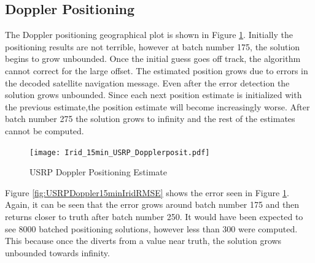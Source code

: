 \documentclass[12pt]{report}
\begin{document}
\subsection{Doppler Positioning}
The Doppler positioning geographical plot is shown in Figure \ref{fig:USRPDoppler15minIridPosit}. Initially the positioning results are not terrible, however at batch number 175, the solution begins to grow unbounded. Once the initial guess goes off track, the algorithm cannot correct for the large offset. The estimated position grows due to errors in the decoded satellite navigation message. Even after the error detection the solution grows unbounded. Since each next position estimate is initialized with the previous estimate,the position estimate will become increasingly worse. After batch number 275 the solution grows to infinity and the rest of the estimates cannot be computed. 

\begin{figure}[h!]
    \centering
    \texttt{[image: Irid\_15min\_USRP\_Dopplerposit.pdf]}
    \caption{USRP Doppler Positioning Estimate}
    \label{fig:USRPDoppler15minIridPosit}
\end{figure}

Figure \ref{fig:USRPDoppler15minIridRMSE} shows the error seen in Figure \ref{fig:USRPDoppler15minIridPosit}. Again, it can be seen that the error grows around batch number 175 and then returns closer to truth after batch number 250. It would have been expected to see 8000 batched positioning solutions, however less than 300 were computed. This because once the diverts from a value near truth, the solution grows unbounded towards infinity. 
\end{document}
